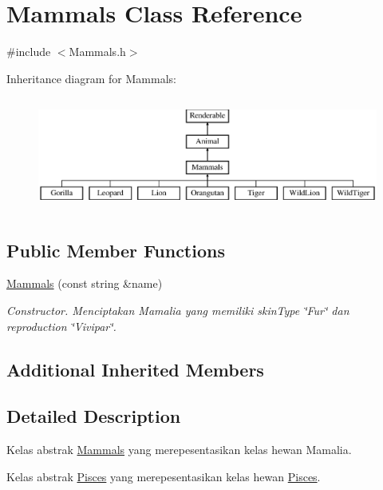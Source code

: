 \hypertarget{classMammals}{\section{Mammals Class Reference}
\label{classMammals}
}


{\ttfamily \#include $<$Mammals.\+h$>$}

Inheritance diagram for Mammals\+:\begin{figure}[H]
\begin{center}
\leavevmode
\includegraphics[height=3.764706cm]{classMammals}
\end{center}
\end{figure}
\subsection*{Public Member Functions}
\begin{DoxyCompactItemize}
\item 
\hyperlink{classMammals_a039a67cdea1502873661ec2fa55e13d5}{Mammals} (const string \&name)
\begin{DoxyCompactList}\small\item\em Constructor. Menciptakan Mamalia yang memiliki skin\+Type \char`\"{}\+Fur\char`\"{} dan reproduction \char`\"{}\+Vivipar\char`\"{}. \end{DoxyCompactList}\end{DoxyCompactItemize}
\subsection*{Additional Inherited Members}


\subsection{Detailed Description}
Kelas abstrak \hyperlink{classMammals}{Mammals} yang merepesentasikan kelas hewan Mamalia.

Kelas abstrak \hyperlink{classPisces}{Pisces} yang merepesentasikan kelas hewan \hyperlink{classPisces}{Pisces}. 

